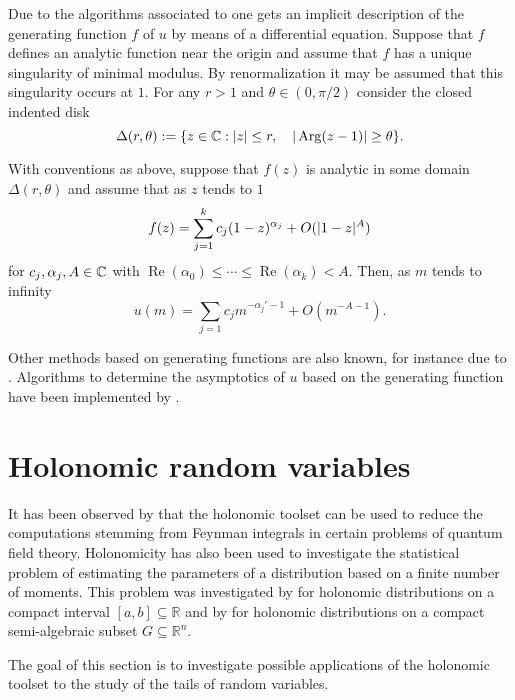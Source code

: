     Due to the algorithms associated to  one gets an implicit description of the generating function $f$ of $u$ by means of a differential equation.
    Suppose that $f$ defines an analytic function near the origin and assume that $f$ has a unique singularity of minimal modulus.
    By renormalization it may be assumed that this singularity occurs at $1$.
    For any $r>1$ and $\theta \in (0,\pi/2)$  consider the closed indented disk
    $$\Delta(r,\theta) := \{z\in \mathbb{C}: \vert z \vert\leq r, \quad \vert \operatorname{Arg}(z-1) \vert\geq \theta\}.$$
    \begin{theorem}{\cite[Corollary 3]{flajolet1990singularity}}
      With conventions as above, suppose that $f(z)$ is analytic in some domain $\Delta(r,\theta)$ and assume that as $z$ tends to $1$
      $$f(z) = \sum_{j=1}^k c_{j}(1-z)^{\alpha_j} + O(\vert 1-z \vert^A)$$
      for $c_j,\alpha_j,A\in \mathbb{C}$ with $\operatorname{Re}(\alpha_0)\leq \cdots \leq \operatorname{Re}(\alpha_k)<A$.
      Then, as $m$ tends to infinity
      $$u(m) = \sum_{j=1}c_j m^{-\alpha_j' - 1} + O(m^{-A -1}).$$
    \end{theorem}
    Other methods based on generating functions are also known, for instance due to \cite{hayman1956generalisation}.
    Algorithms to determine the asymptotics of $u$ based on the generating function have been implemented by \cite{salvy1991examples}.
\section{Holonomic random variables}
It has been observed by \cite{bitoun2019feynman} that the holonomic toolset can be used to reduce the computations stemming from Feynman integrals in certain problems of quantum field theory.
Holonomicity has also been used to investigate the statistical problem of estimating the parameters of a distribution based on a finite number of moments.
This problem was investigated by \cite{batenkov2009moment} for holonomic distributions on a compact interval $[a,b]\subseteq \mathbb{R}$ and by \cite{brehard2019moment} for holonomic distributions on a compact semi-algebraic subset $G\subseteq \mathbb{R}^n$.

The goal of this section is to investigate possible applications of the holonomic toolset to the study of the tails of random variables.
